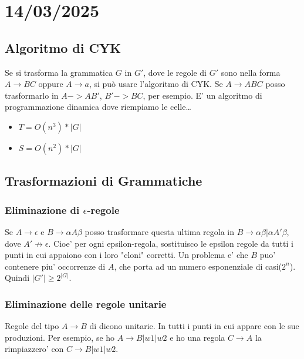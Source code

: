 \chapter{14/03/2025}

\section{Algoritmo di CYK}

Se si trasforma la grammatica $G$ in $G'$, dove le regole di $G'$ sono nella forma $A \rightarrow BC$ oppure $A \rightarrow a$, si pu\`o usare l'algoritmo di CYK.
Se $A \rightarrow ABC$ posso trasformarlo in $A -> AB'$, $B' -> BC$, per esempio.
E' un algoritmo di programmazione dinamica dove riempiamo le celle\dots

\begin{itemize}
  \item $T = O(n^3) * |G|$
  \item $S = O(n^2) * |G|$
\end{itemize}

\section{Trasformazioni di Grammatiche}

\subsection{Eliminazione di $\epsilon$-regole}

Se $A \rightarrow \epsilon$ e $B \rightarrow \alpha A \beta$ posso trasformare questa ultima regola in $B \rightarrow \alpha \beta | \alpha A' \beta$, dove $A' \not \rightarrow \epsilon$.
Cioe' per ogni epsilon-regola, sostituisco le epsilon regole da tutti i punti in cui appaiono con i loro "cloni" corretti.
Un problema e' che $B$ puo' contenere piu' occorrenze di $A$, che porta ad un numero esponenziale di casi($2^n$). Quindi $|G'| \geq 2^{|G|}$.

\subsection{Eliminazione delle regole unitarie}

Regole del tipo $A \rightarrow B$ di dicono unitarie. In tutti i punti in cui appare con le sue produzioni. Per esempio, se ho $A \rightarrow B | w1 | w2$ e ho una regola $C \rightarrow A$ la rimpiazzero' con $C \rightarrow B | w1 | w2$.

